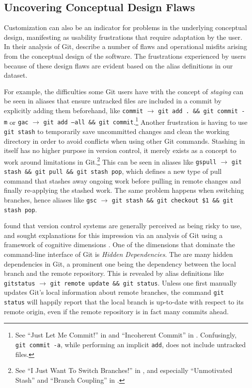 \documentclass[sigconf,nonacm,screen]{acmart}
\newcommand{\alias}[2]{{\texttt{#1} $\rightarrow$ \texttt{#2}}}
\begin{document}
\subsection{Uncovering Conceptual Design Flaws}

Customization can also be an indicator for problems in the underlying conceptual design, manifesting as usability frustrations that require adaptation by the user.
In their analysis of Git, \citet{perez:13,perez:16} describe a number of flaws and operational misfits arising from the conceptual design of the software.
The frustrations experienced by users because of these design flaws are evident based on the alias definitions in our dataset.

For example, the difficulties some Git users have with the concept of \emph{staging} can be seen in aliases that ensure untracked files are included in a commit by explicitly adding them beforehand, like \alias{commit}{git add . \&\& git commit -m} or \alias{gac}{git add --all \&\& git commit}.\footnote{See ``Just Let Me Commit!'' in \cite{perez:13} and ``Incoherent Commit'' in \cite{perez:16}. Confusingly, \texttt{git commit -a}, while performing an implicit \texttt{add}, does not include untracked files.} Another frustration is having to use \texttt{git stash} to temporarily save uncommitted changes and clean the working directory in order to avoid conflicts when using other Git commands.
Stashing in itself has no higher purpose in version control, it merely exists as a concept to work around limitations in Git.\footnote{See ``I Just Want To Switch Branches!'' in \cite{perez:13}, and especially ``Unmotivated Stash'' and ``Branch Coupling'' in \cite{perez:16}.}
This can be seen in aliases like \alias{gspull}{git stash \&\& git pull \&\& git stash pop}, which defines a new type of pull command that stashes away ongoing work before pulling in remote changes and finally re-applying the stashed work.
The same problem happens when switching branches, hence aliases like \alias{gsc}{git stash \&\& git checkout \$1 \&\& git stash pop}.

\citet{church:14} found that version control systems are generally perceived as being risky to use, and sought explanations for this impression via an analysis of Git using a framework of cognitive dimensions \citep{green:96}.
One of the dimensions that dominate the command-line interface of Git is \emph{Hidden Dependencies}.
The are many hidden dependencies in Git, a prominent one being the dependency between the local branch and the remote repository.
This is revealed by alias definitions like \alias{gitstatus}{git~remote~update \&\& git~status}.
Unless one first manually updates Git's local information about remote branches, the command \texttt{git status} will happily report that the local branch is up-to-date with respect to its remote origin, even if the remote repository is in fact many commits ahead.
\end{document}
